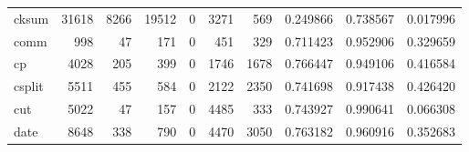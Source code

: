 \begin{longtable}{lrrrrrrrrr}
cksum     &                               31618 &                                            8266 &                                          19512 &                                             0 &                                           3271 &                                          569 &                                           0.249866 &                               0.738567 &                             0.017996 \\
comm      &                                 998 &                                              47 &                                            171 &                                             0 &                                            451 &                                          329 &                                           0.711423 &                               0.952906 &                             0.329659 \\
cp        &                                4028 &                                             205 &                                            399 &                                             0 &                                           1746 &                                         1678 &                                           0.766447 &                               0.949106 &                             0.416584 \\
csplit    &                                5511 &                                             455 &                                            584 &                                             0 &                                           2122 &                                         2350 &                                           0.741698 &                               0.917438 &                             0.426420 \\
cut       &                                5022 &                                              47 &                                            157 &                                             0 &                                           4485 &                                          333 &                                           0.743927 &                               0.990641 &                             0.066308 \\
date      &                                8648 &                                             338 &                                            790 &                                             0 &                                           4470 &                                         3050 &                                           0.763182 &                               0.960916 &                             0.352683 \\

\end{longtable}
